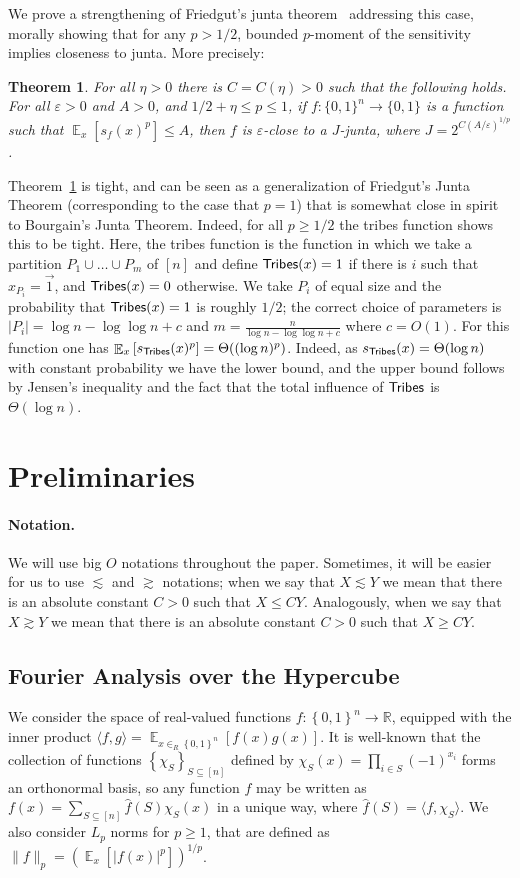 \documentclass[10pt]{article}
\newcommand{\card}[1]{\left\lvert #1\right\rvert}
\newcommand{\set}[1]{{\left\{#1\right\}}}
\newcommand{\Expect}[2]{{\mathop{\mathbb E}_{#1}\left[#2\right]}}
\newcommand{\norm}[1]{\lVert #1\rVert}
\newcommand{\power}[1]{\set{0,1}^{#1}}
\newcommand{\inner}[2]{\langle #1,#2\rangle}
\newcommand{\eps}{\varepsilon}
\renewcommand{\gg}{\gtrsim}
\renewcommand{\ll}{\lesssim}
\newtheorem{thm}{Theorem}[section]
\begin{document}
We prove a strengthening of Friedgut's junta theorem~\cite{Friedgut} addressing this case, morally showing that for any $p>1/2$, bounded $p$-moment of
the sensitivity implies closeness to junta. More precisely:
\begin{thm}\label{thm:super_fried}
  For all $\eta>0$ there is $C = C(\eta)>0$ such that  the following holds.
  For all $\eps>0$ and $A>0$, and $1/2 + \eta\leq p\leq 1$, if $f\colon\{0,1\}^n\to\{0,1\}$ is a function such that
  $\Expect{x}{s_f(x)^{p}}\leq A$, then $f$ is $\eps$-close to a $J$-junta, where $J = 2^{C\left(A/\eps\right)^{1/p}}$.
\end{thm}
Theorem~\ref{thm:super_fried} is tight, and can be seen as a generalization of Friedgut's Junta Theorem (corresponding to the case that
$p=1$) that is somewhat close in spirit to Bourgain's Junta Theorem. Indeed, for all $p\geq 1/2$ the tribes function shows
this to be tight. Here, the tribes function is the function in which we take a partition $P_1\cup\ldots\cup P_m$ of $[n]$
and define ${\sf Tribes}(x) = 1$ if there is $i$ such that $x_{P_{i}} = \vec{1}$, and ${\sf Tribes}(x) = 0$ otherwise.
We take $P_i$ of equal size and the probability that ${\sf Tribes}(x)=1$ is roughly $1/2$; the correct choice
of parameters is $\card{P_i} = \log n - \log\log n + c$
and $m =  \frac{n}{\log n - \log\log n + c}$ where $c = O(1)$.
For this function one has $\Expect{x}{s_{{\sf Tribes}}(x)^{p}} = \Theta((\log n)^p)$. Indeed, as $s_{{\sf Tribes}}(x) = \Theta(\log n)$ with
constant probability we have the lower bound, and the upper bound follows by Jensen's inequality and the fact that the total influence of ${\sf Tribes}$
is $\Theta(\log n)$.

\section{Preliminaries}
\paragraph{Notation.} We will use big $O$ notations throughout the paper. Sometimes, it will be easier for us to use
$\ll$ and $\gg$ notations; when we say that $X\ll Y$ we mean that there is an absolute constant $C>0$ such that $X\leq C Y$.
Analogously, when we say that $X\gg Y$ we mean that there is an absolute constant $C>0$ such that $X\geq C Y$.

\subsection{Fourier Analysis over the Hypercube}
We consider the space of real-valued functions $f:\power{n} \to {\mathbb R}$,
equipped with the inner product $\inner{f}{g} = \Expect{x\in_R\power{n}}{f(x)g(x)}$.
It is well-known that the collection of functions $\set{\chi_S}_{S\subseteq[n]}$ defined by
$\chi_S(x) = \prod\limits_{i\in S}{(-1)^{x_i}}$ forms an orthonormal basis, so any function $f$
may be written as $f(x) = \sum\limits_{S\subseteq[n]}{\widehat{f}(S)\chi_S(x)}$ in a unique way,
where
$\widehat{f}(S) = \inner{f}{\chi_S}$.
We also consider $L_p$ norms for $p \geq 1$,
that are defined as $\norm{f}_p= \left(\Expect{x}{\card{f(x)}^p}\right)^{1/p}$.
\end{document}
